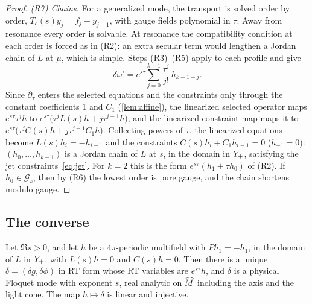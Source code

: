 \begin{proof}
\emph{(R7) Chains.} For a generalized mode, the transport is solved order by order,
$T_c(s)y_j=f_j-y_{j-1}$, with gauge fields polynomial in $\tau$. Away from resonance every order is solvable.
At resonance the compatibility condition at each order is forced as in (R2): an extra secular term would
lengthen a Jordan chain of $L$ at $\mu$, which is simple. Steps (R3)--(R5) apply to each profile and give
\[
  \delta\omega'=e^{s\tau}\sum_{j=0}^{k-1}\frac{\tau^j}{j!}\,h_{k-1-j}.
\]
Since $\partial_\tau$ enters the selected equations and the constraints only through the constant coefficients
$1$ and $C_1$ (\cref{lem:affine}), the linearized selected operator maps $e^{s\tau}\tau^jh$ to
$e^{s\tau}\big(\tau^jL(s)h+j\tau^{j-1}h\big)$, and the linearized constraint map maps it to
$e^{s\tau}\big(\tau^jC(s)h+j\tau^{j-1}C_1h\big)$. Collecting powers of $\tau$, the linearized equations become
$L(s)h_i=-h_{i-1}$ and the constraints $C(s)h_i+C_1h_{i-1}=0$ ($h_{-1}=0$): $(h_0,\dots,h_{k-1})$ is a Jordan chain of
$L$ at $s$, in the domain in $Y_{+}$, satisfying the jet constraints~\eqref{eq:jet}. For $k=2$ this is the form
$e^{s\tau}(h_1+\tau h_0)$ of (R2). If
$h_0\in\mathcal G_s$, then by (R6) the lowest order is pure gauge, and the chain shortens modulo gauge.
\end{proof}

\subsection{The converse}\label{sec:physical-converse}

\begin{lemma}\label{lem:V}
Let $\Re s>0$, and let $h$ be a $4\pi$-periodic multifield with $Ph_1=-h_1$, in the domain of $L$ in
$Y_{+}$, with $L(s)h=0$ and $C(s)h=0$. Then there is a unique $\delta=(\delta g,\delta\phi)$ in RT form whose RT
variables are $e^{s\tau}h$, and $\delta$ is a physical Floquet mode with exponent $s$, real analytic on
$\widehat M$ including the axis and the light cone. The map $h\mapsto\delta$ is linear and injective.
\end{lemma}

